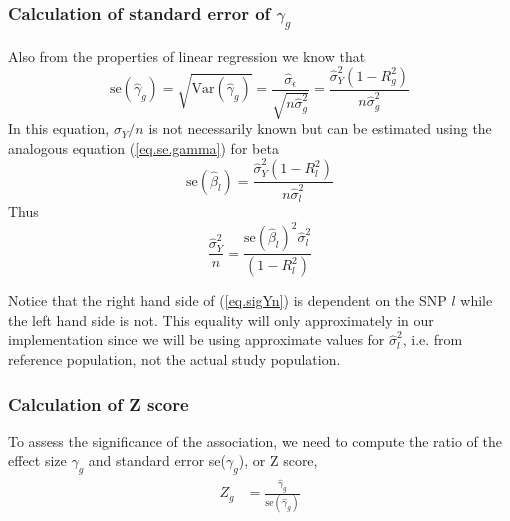 \documentclass[10pt]{article}
\begin{document}
\subsubsection*{Calculation of standard error of $\gamma_g$}
Also from the properties of linear regression we know that 
\begin{equation}
\text{se}(\hat\gamma_g) = \sqrt{\text{Var}(\hat\gamma_g)} = \frac{\hat\sigma_\epsilon}{ \sqrt{n \hat\sigma^2_g} } = \frac{\hat\sigma^2_Y (1-R^2_g)}{n\hat\sigma_g^2} \label{eq.se.gamma}
\end{equation}
In this equation, $\sigma_Y/n$ is not necessarily known but can be estimated using the analogous equation (\ref{eq.se.gamma}) for beta
\begin{equation}
\text{se}(\hat\beta_l) = \frac{\hat\sigma^2_Y (1-R^2_l)}{n\hat\sigma_l^2} \label{eq.se.beta}
\end{equation}
Thus
\begin{equation}
\frac{\hat\sigma_Y^2}{n} = \frac{\text{se}(\hat\beta_l)^2 \hat\sigma_l^2}{(1-R^2_l)} \label{eq.sigYn}
\end{equation}

Notice that the right hand side of (\ref{eq.sigYn}) is dependent on the SNP $l$ while the left hand side is not. This equality will only approximately in our implementation since we will be using approximate values for $\hat\sigma_l^2$, i.e. from reference population, not the actual study population.

\subsubsection*{Calculation of Z score}

To assess the significance of the association, we need to compute the ratio of the effect size $\gamma_g$ and standard error se($\gamma_g$), or Z score, 
\begin{align}
Z_g & = \frac{ \hat\gamma_g}{\text{se}(\hat\gamma_g)} 
\end{align}
\end{document}

